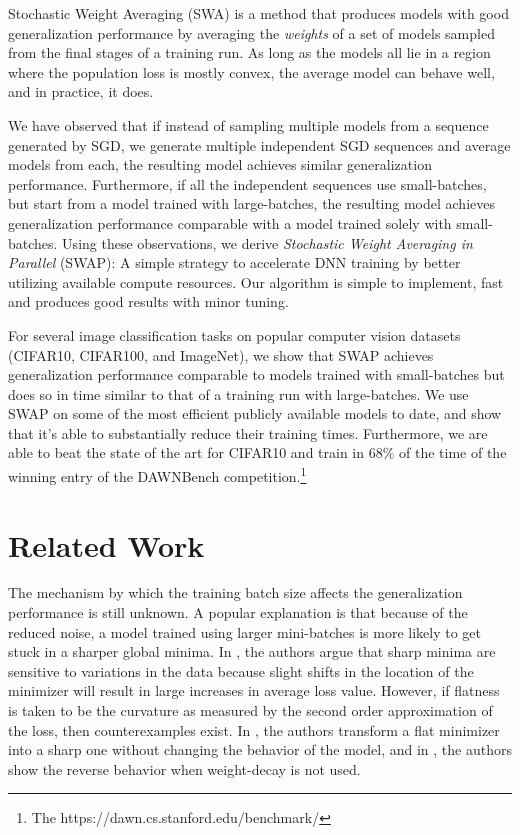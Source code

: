 \documentclass{article} %
\begin{document}
Stochastic Weight Averaging (SWA) \citep{swa} is a method
that produces models with good generalization performance by averaging the
\emph{weights} of a set of models sampled from the final stages of a training
run. As long as the models all lie in a region where the population loss is
mostly convex, the average model can behave well, and in practice, it does. 

We have observed that if instead of sampling multiple models from a sequence
generated by SGD, we generate multiple independent SGD sequences and average
models from each, the resulting model achieves similar generalization performance. 
Furthermore, if all the independent
sequences use small-batches, but start from a model trained with large-batches, the resulting model
achieves generalization performance comparable
with a model trained solely with small-batches. Using these observations, we
derive \emph{Stochastic Weight Averaging in Parallel} (SWAP): A simple
strategy to accelerate DNN training by better utilizing available compute
resources. Our algorithm is simple to implement, fast and produces good results
with minor tuning. 

For several image classification tasks on popular computer vision datasets
(CIFAR10, CIFAR100, and ImageNet), we show that SWAP achieves generalization
performance comparable to models trained with small-batches but does so in time
similar to that of a training run with large-batches.  We use SWAP on some of
the most efficient publicly available models to date, and show that it's able
to substantially reduce their training times.
Furthermore, we are able to beat the state of the art for CIFAR10 and train in
$68\%$ of the time of the winning entry of the DAWNBench
competition.\footnote{The https://dawn.cs.stanford.edu/benchmark/} 

\section{Related Work}


The mechanism by which the training batch size affects the generalization
performance is still unknown. A popular explanation is
that because of the reduced noise, a model trained using larger mini-batches is
more likely to get stuck in a sharper global minima. In \citep{keskar}, the
authors argue that sharp minima are sensitive to variations in the data because
slight shifts in the location of the minimizer will result in large increases
in average loss value. However, if flatness is taken to be the curvature as
measured by the second order approximation of the loss, then counterexamples
exist.  In \citep{bengio2017sharp}, the authors transform a flat minimizer into
a sharp one without changing the behavior of the model, and in
\citep{li2018visualizing}, the authors show the reverse behavior when
weight-decay is not used.
\end{document}
